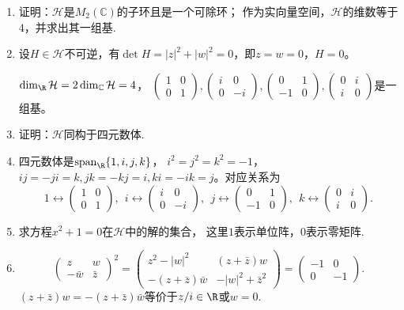 \begin{enumerate}
    \item[(a)]证明：$\mathcal{H}$是$M_2(\mathbb{C})$的子环且是一个可除环；
        作为实向量空间，$\mathcal{H}$的维数等于$4$，并求出其一组基.
    \item[\textbf{证明:}]
        设$H\in\mathcal{H}$不可逆，有$\det H=|z|^2+|w|^2=0$，即$z=w=0$，$H=0$。
        
        $\dim_\R\mathcal{H}=2\dim_\mathbb{C}\mathcal{H}=4$，
        $\begin{pmatrix}1&0\\0&1\end{pmatrix},
        \begin{pmatrix}i&0\\0&-i\end{pmatrix},
        \begin{pmatrix}0&1\\-1&0\end{pmatrix},
        \begin{pmatrix}0&i\\i&0\end{pmatrix}$是一组基。

    \item[(b)]证明：$\mathcal{H}$同构于四元数体.
    \item[\textbf{证明:}]四元数体是$\operatorname{span}_\R\{1,i,j,k\}$，
        $i^2=j^2=k^2=-1$，$ij=-ji=k,jk=-kj=i,ki=-ik=j$。对应关系为
        $$1\leftrightarrow\begin{pmatrix}1&0\\0&1\end{pmatrix},\ \ 
        i\leftrightarrow\begin{pmatrix}i&0\\0&-i\end{pmatrix},\ \ 
        j\leftrightarrow\begin{pmatrix}0&1\\-1&0\end{pmatrix},\ \ 
        k\leftrightarrow\begin{pmatrix}0&i\\i&0\end{pmatrix}.$$

    \item[(c)]求方程$x^2+1=0$在$\mathcal{H}$中的解的集合，
        这里$1$表示单位阵，$0$表示零矩阵.
    \item[\textbf{证明:}]
        $$\begin{pmatrix}z&w\\-\bar{w}&\bar{z}\end{pmatrix}^2
        =\begin{pmatrix}z^2-|w|^2&(z+\bar{z})w\\
        -(z+\bar{z})\bar{w}&-|w|^2+\bar{z}^2\end{pmatrix}
        =\begin{pmatrix}-1&0\\0&-1\end{pmatrix}.$$
        $(z+\bar{z})w=-(z+\bar{z})\bar{w}$等价于$z/i\in\R$或$w=0$.


\end{enumerate}
